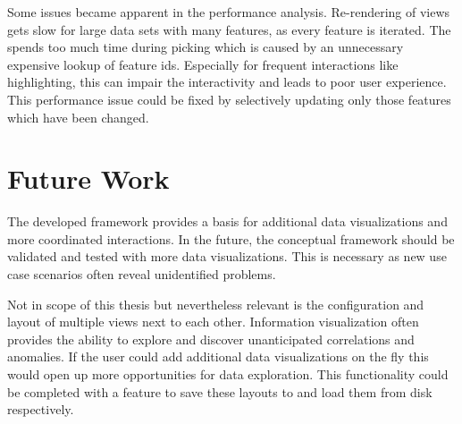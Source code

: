 Some issues became apparent in the performance analysis.
Re-rendering of views gets slow for large data sets with many features, as every feature is iterated.
The \tmap{} spends too much time during picking which is caused by an unnecessary expensive lookup of feature ids.
Especially for frequent interactions like highlighting, this can impair the interactivity and leads to poor user experience.
This performance issue could be fixed by selectively updating only those features which have been changed.

\section{Future Work}

The developed \cmv{} framework provides a basis for additional data visualizations and more coordinated interactions.
In the future, the conceptual framework should be validated and tested with more data visualizations.
This is necessary as new use case scenarios often reveal unidentified problems.

Not in scope of this thesis but nevertheless relevant is the configuration and layout of multiple views next to each other.
Information visualization often provides the ability to explore and discover unanticipated correlations and anomalies.
If the user could add additional data visualizations on the fly this would open up more opportunities for data exploration.
This functionality could be completed with a feature to save these layouts to and load them from disk respectively.

